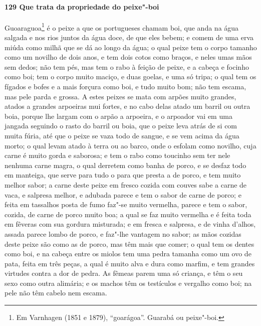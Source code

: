 \begin{linenumbers}
\paragraph{129 Que trata da propriedade do peixe"-boi}\quad
Guoaraguoa\footnote{ Em Varnhagen (1851 e 1879), ``goarágoa''. Guarabá ou peixe"-boi.} é o
peixe a que os portugueses chamam boi, que anda na água salgada e nos rios juntos da água
doce, de que eles bebem; e comem de uma erva miúda como milhã que se dá ao longo da água;
o qual peixe tem o corpo tamanho como um novilho de dois anos, e tem dois cotos como
braços, e neles umas mãos sem dedos; não tem pés, mas tem o rabo à feição de peixe, e a
cabeça e focinho como boi; tem o corpo muito maciço, e duas goelas, e uma só tripa; o qual
tem os fígados e bofes e a mais forçura como boi, e tudo muito bom; não tem escama, mas
pele parda e grossa. A estes peixes se mata com arpões muito grandes, atados a grandes
arpoeiras mui fortes, e no cabo delas atado um barril ou outra boia, porque lhe largam com
o arpão a arpoeira, e o arpoador vai em uma jangada seguindo o rasto do barril ou boia,
que o peixe leva atrás de si com muita fúria, até que o peixe se vaza todo de sangue, e se
vem acima da água morto; o qual levam atado à terra ou ao barco, onde o esfolam como
novilho, cuja carne é muito gorda e saborosa; e tem o rabo como toucinho sem ter nele
nenhuma carne magra, o qual derretem como banha de porco, e se desfaz todo em manteiga,
que serve para tudo o para que presta a de porco, e tem muito melhor sabor; a carne deste
peixe em fresco cozida com couves sabe a carne de vaca, e salpresa melhor, e adubada
parece e tem o sabor de carne de porco; e feita em tassalhos posta de fumo faz"-se muito
vermelha, parece e tem o sabor, cozida, de carne de porco muito boa; a qual se faz muito
vermelha e é feita toda em fêveras com sua gordura misturada; e em fresca e salpresa, e de
vinha d'alhos, assada parece lombo de porco, e faz"-lhe vantagem no sabor; as mãos cozidas
deste peixe são como as de porco, mas têm mais que comer; o qual tem os dentes como boi, e
na cabeça entre os miolos tem uma pedra tamanha como um ovo de pata, feita em três peças,
a qual é muito alva e dura como marfim, e tem grandes virtudes contra a dor de pedra. As
fêmeas parem uma só criança, e têm o seu sexo como outra alimária; e os machos têm os
testículos e vergalho como boi; na pele não têm cabelo nem escama.


\end{linenumbers}
